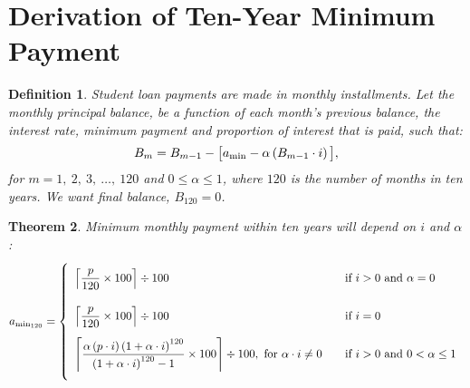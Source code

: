 \documentclass[12pt,letterpaper,oneside]{article}
\newtheorem{theorem}{Theorem}[section] %
\newtheorem{definition}[theorem]{Definition} %
\theoremstyle{remark} %
\begin{document}
	\newpage
	
\section{Derivation of Ten-Year Minimum Payment}

	\begin{definition}
	Student loan payments are made in monthly installments. Let the monthly principal balance, be a function of each month's previous balance, the interest rate, minimum payment and proportion of interest that is paid, such that:
	\begin{equation}
	B_{m}=B_{m-1}-\big[a_{\rm{min}}-\alpha\left(B_{m-1}\cdot i\right)\big],\label{eq}
	\end{equation}
	for $m=1,\ 2,\ 3,\ \dots,\ 120$ and $0\leq\alpha\leq1$, where $120$ is the number of months in ten years. 
	We want final balance, $B_{120}=0$.
	\end{definition}

	\renewcommand{\base}{\left(1+\alpha\cdot i\right)}
	\begin{theorem}
	Minimum monthly payment within ten years will depend on $i$ and $\alpha$:
	\small
	\[
	a_{\rm{min_{120}}}=
	\left\{
	\begin{array}{l l}
	\\[-6pt]
	\left\lceil{\dfrac{p}{120}\times 100}\right\rceil\div 100&\quad\mbox{if } i>0 \mbox{ and }\alpha=0\\[18pt]
	\left\lceil{\dfrac{p}{120}\times 100}\right\rceil\div 100&\quad\mbox{if } i=0\\[12pt]
	\left\lceil{\dfrac{\alpha\left(p\cdot i\right)\base^{120}}{\base^{120}-1}\times 100}\right\rceil\div 100,\mbox{ for }\alpha\cdot i\neq 0 &\quad\mbox{if } i>0\mbox{ and }0<\alpha\leq1
	\\[18pt]
	\end{array}
	\right. 
	\]
	\end{theorem}

	\renewcommand{\bo}{p\left(1+\alpha\cdot i\right)-a_{\rm{min}}}
	\newcommand{\bt}{p\left(1+\alpha\cdot i\right)^{2}-\left(1+\alpha\cdot i\right)a_{\rm{min}}-a_{\rm{min}}}
	\renewcommand{\base}{\left(1+\alpha\cdot i\right)} %
\end{document}
